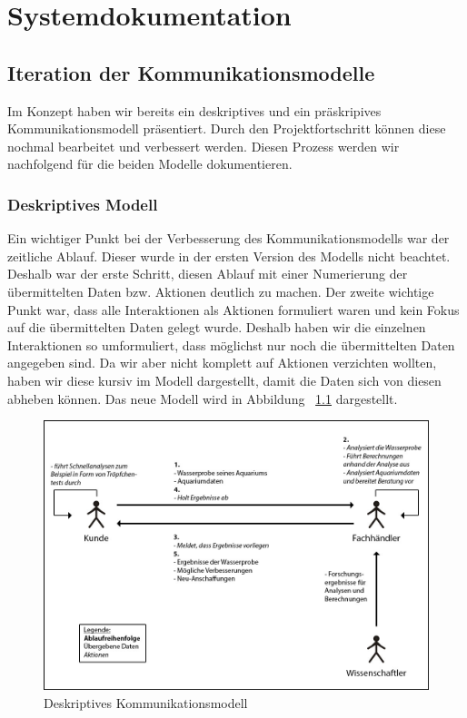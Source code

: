 \chapter{Systemdokumentation}

\section{Iteration der Kommunikationsmodelle}

Im Konzept haben wir bereits ein deskriptives und ein präskripives Kommunikationsmodell präsentiert. Durch den Projektfortschritt können diese nochmal bearbeitet und verbessert werden. Diesen Prozess werden wir nachfolgend für die beiden Modelle dokumentieren.

\subsection{Deskriptives Modell}

Ein wichtiger Punkt bei der Verbesserung des Kommunikationsmodells war der zeitliche Ablauf. Dieser wurde in der ersten Version des Modells nicht beachtet. Deshalb war der erste Schritt, diesen Ablauf mit einer Numerierung der übermittelten Daten bzw. Aktionen deutlich zu machen. Der zweite wichtige Punkt war, dass alle Interaktionen als Aktionen formuliert waren und kein Fokus auf die übermittelten Daten gelegt wurde. Deshalb haben wir die einzelnen Interaktionen so umformuliert, dass möglichst nur noch die übermittelten Daten angegeben sind. Da wir aber nicht komplett auf Aktionen verzichten wollten, haben wir diese kursiv im Modell dargestellt, damit die Daten sich von diesen abheben können. Das neue Modell wird in Abbildung ~\ref{komm1} dargestellt.

\begin{figure}[htbp]
\centering
\includegraphics[width=0.85\linewidth]{Kommunikationsdiagramm1}
\caption{Deskriptives Kommunikationsmodell}
\label{komm1}
\end{figure}

